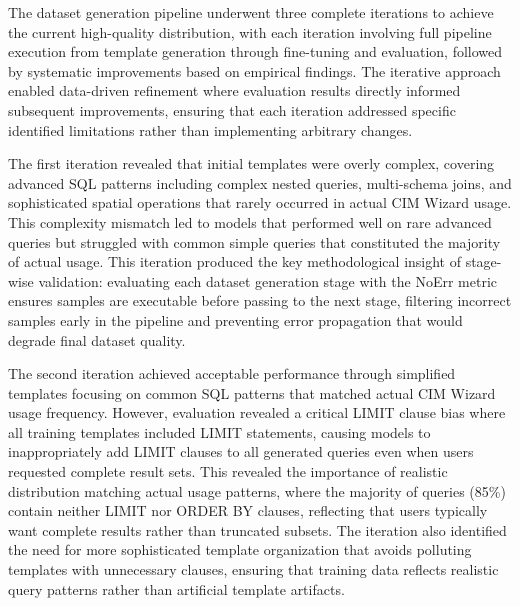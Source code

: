 The dataset generation pipeline underwent three complete iterations to achieve the current high-quality distribution, with each iteration involving full pipeline execution from template generation through fine-tuning and evaluation, followed by systematic improvements based on empirical findings. The iterative approach enabled data-driven refinement where evaluation results directly informed subsequent improvements, ensuring that each iteration addressed specific identified limitations rather than implementing arbitrary changes.

The first iteration revealed that initial templates were overly complex, covering advanced SQL patterns including complex nested queries, multi-schema joins, and sophisticated spatial operations that rarely occurred in actual CIM Wizard usage. This complexity mismatch led to models that performed well on rare advanced queries but struggled with common simple queries that constituted the majority of actual usage. This iteration produced the key methodological insight of stage-wise validation: evaluating each dataset generation stage with the NoErr metric ensures samples are executable before passing to the next stage, filtering incorrect samples early in the pipeline and preventing error propagation that would degrade final dataset quality.

The second iteration achieved acceptable performance through simplified templates focusing on common SQL patterns that matched actual CIM Wizard usage frequency. However, evaluation revealed a critical LIMIT clause bias where all training templates included LIMIT statements, causing models to inappropriately add LIMIT clauses to all generated queries even when users requested complete result sets. This revealed the importance of realistic distribution matching actual usage patterns, where the majority of queries (85\%) contain neither LIMIT nor ORDER BY clauses, reflecting that users typically want complete results rather than truncated subsets. The iteration also identified the need for more sophisticated template organization that avoids polluting templates with unnecessary clauses, ensuring that training data reflects realistic query patterns rather than artificial template artifacts.

